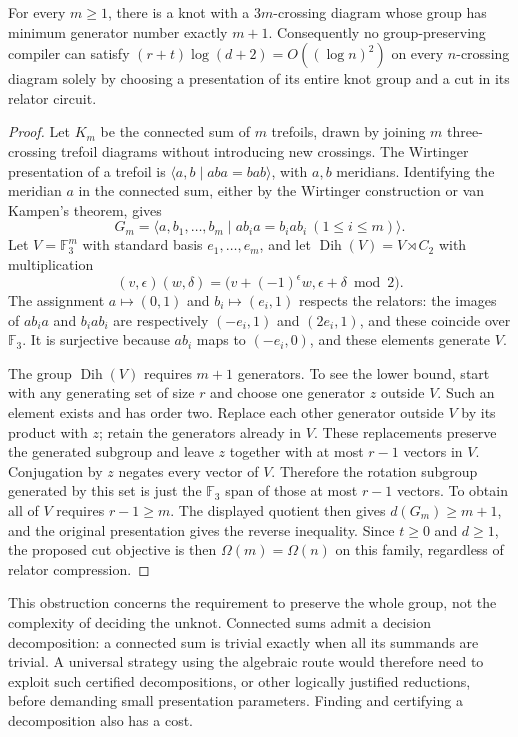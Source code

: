 \begin{proposition}
\label{prop:su2-rank-obstruction}
For every $m\geq1$, there is a knot with a $3m$-crossing diagram whose
group has minimum generator number exactly $m+1$.  Consequently no
group-preserving compiler can satisfy
$(r+t)\log(d+2)=O((\log n)^2)$ on every $n$-crossing diagram solely
by choosing a presentation of its entire knot group and a cut in its
relator circuit.
\end{proposition}

\begin{proof}
Let $K_m$ be the connected sum of $m$ trefoils, drawn by joining $m$
three-crossing trefoil diagrams without introducing new crossings.
The Wirtinger presentation of a trefoil is
$\langle a,b\mid aba=bab\rangle$, with $a,b$ meridians.
Identifying the meridian $a$ in the connected sum, either by the
Wirtinger construction or van Kampen's theorem, gives
\[
 G_m=\langle a,b_1,\ldots,b_m\mid
     ab_i a=b_i a b_i\ (1\leq i\leq m)\rangle.
\]
Let $V=\mathbb F_3^m$ with standard basis $e_1,\ldots,e_m$, and
let $\operatorname{Dih}(V)=V\rtimes C_2$ with multiplication
\[
 (v,\epsilon)(w,\delta)
  =\bigl(v+(-1)^\epsilon w,\epsilon+\delta\bmod2\bigr).
\]
The assignment $a\mapsto(0,1)$ and $b_i\mapsto(e_i,1)$ respects
the relators: the images of $ab_i a$ and $b_i a b_i$ are respectively
$(-e_i,1)$ and $(2e_i,1)$, and these coincide over $\mathbb F_3$.
It is surjective because $ab_i$ maps to $(-e_i,0)$, and these elements
generate $V$.

The group $\operatorname{Dih}(V)$ requires $m+1$ generators.  To
see the lower bound, start with any generating set of size $r$ and
choose one generator $z$ outside $V$.  Such an element exists and has
order two.  Replace each other generator outside $V$ by its product
with $z$; retain the generators already in $V$.  These replacements
preserve the generated subgroup and leave $z$ together with at most
$r-1$ vectors in $V$.  Conjugation by $z$ negates every vector of
$V$.  Therefore the rotation subgroup generated by this set is just
the $\mathbb F_3$ span of those at most $r-1$ vectors.  To obtain
all of $V$ requires $r-1\geq m$.  The displayed quotient then gives
$d(G_m)\geq m+1$, and the original presentation gives the reverse
inequality.  Since $t\geq0$ and $d\geq1$,
the proposed cut objective is then $\Omega(m)=\Omega(n)$ on this
family, regardless of relator compression.
\end{proof}

This obstruction concerns the requirement to preserve the whole group,
not the complexity of deciding the unknot.  Connected sums admit a
decision decomposition: a connected sum is trivial exactly when all its
summands are trivial.  A universal strategy using the algebraic route
would therefore need to exploit such certified decompositions, or other
logically justified reductions, before demanding small presentation
parameters.  Finding and certifying a decomposition also has a cost.

